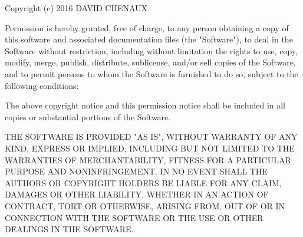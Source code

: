 \documentclass[a4paper, 11pt, oneside]{thesis}  %
\begin{document}
Copyright (c) 2016 DAVID CHENAUX

Permission is hereby granted, free of charge, to any person obtaining a copy of this software and associated documentation files (the "Software"), to deal in the Software without restriction, including without limitation the rights to use, copy, modify, merge, publish, distribute, sublicense, and/or sell copies of the Software, and to permit persons to whom the Software is furnished to do so, subject to the following conditions:

The above copyright notice and this permission notice shall be included in all copies or substantial portions of the Software.

THE SOFTWARE IS PROVIDED "AS IS", WITHOUT WARRANTY OF ANY KIND, EXPRESS OR IMPLIED, INCLUDING BUT NOT LIMITED TO THE WARRANTIES OF MERCHANTABILITY, FITNESS FOR A PARTICULAR PURPOSE AND NONINFRINGEMENT. IN NO EVENT SHALL THE AUTHORS OR COPYRIGHT HOLDERS BE LIABLE FOR ANY CLAIM, DAMAGES OR OTHER LIABILITY, WHETHER IN AN ACTION OF CONTRACT, TORT OR OTHERWISE, ARISING FROM, OUT OF OR IN CONNECTION WITH THE SOFTWARE OR THE USE OR OTHER DEALINGS IN THE SOFTWARE.


\clearpage

\backmatter

\label{Bibliography}


\end{document}

